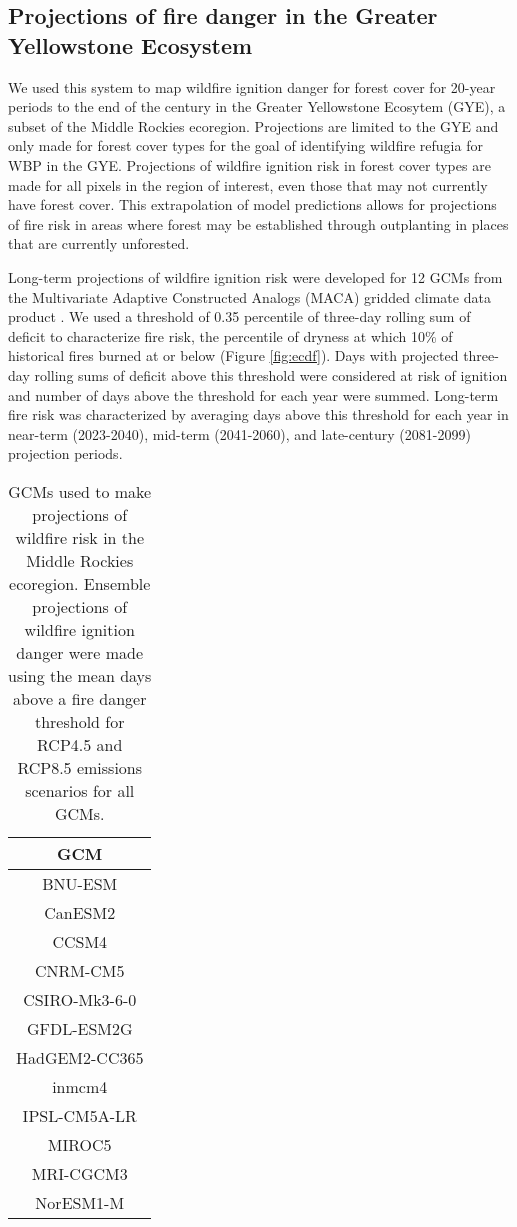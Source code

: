 \documentclass[11p]{article}
\begin{document}
\subsection{Projections of fire danger in the Greater Yellowstone Ecosystem}

We used this system to map wildfire ignition danger for forest cover for 20-year periods to the end of the century in the Greater Yellowstone Ecosytem (GYE), a subset of the Middle Rockies ecoregion. Projections are limited to the GYE and only made for forest cover types for the goal of identifying wildfire refugia for WBP in the GYE. Projections of wildfire ignition risk in forest cover types are made for all pixels in the region of interest, even those that may not currently have forest cover. This extrapolation of model predictions allows for projections of fire risk in areas where forest may be established through outplanting in places that are currently unforested.

Long-term projections of wildfire ignition risk were developed for 12 GCMs from the Multivariate Adaptive Constructed Analogs (MACA) gridded climate data product \citep{abatzoglouComparisonStatisticalDownscaling2012}. We used a threshold of 0.35 percentile of three-day rolling sum of deficit to characterize fire risk, the percentile of dryness at which 10\% of historical fires burned at or below (Figure \ref{fig:ecdf}). Days with projected three-day rolling sums of deficit above this threshold were considered at risk of ignition and number of days above the threshold for each year were summed. Long-term fire risk was characterized by averaging days above this threshold for each year in near-term (2023-2040), mid-term (2041-2060), and late-century (2081-2099) projection periods. 

\begin{table}[htbp]
  \centering
  \begin{tabular}{ c }
    \hline
    GCM \\
    \hline
    BNU-ESM \\
    CanESM2 \\
    CCSM4 \\
    CNRM-CM5 \\
    CSIRO-Mk3-6-0 \\
    GFDL-ESM2G \\
    HadGEM2-CC365 \\
    inmcm4 \\
    IPSL-CM5A-LR \\
    MIROC5 \\
    MRI-CGCM3 \\
    NorESM1-M \\
    \hline
  \end{tabular}
  \caption{GCMs used to make projections of wildfire risk in the Middle Rockies ecoregion. Ensemble projections of wildfire ignition danger were made using the mean days above a fire danger threshold for RCP4.5 and RCP8.5 emissions scenarios for all GCMs.}
  \label{table:gcms}
\end{table}
\end{document}
